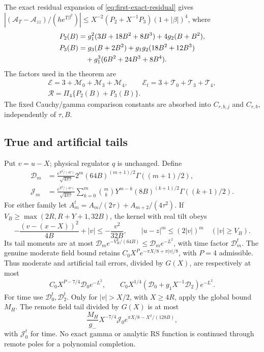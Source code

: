 \documentclass[11pt]{article}
\numberwithin{equation}{section}
\begin{document}
The exact residual expansion of \eqref{eq:first-exact-residual} gives
\(|(\mathcal A_T-\mathcal A_{zz})/(he^{T\beta^2})|
\le X^{-2}(P_2+X^{-1}P_3)(1+|\beta|)^4\), where
\begin{align}
 P_2(B)&=g_1^2(3B+18B^2+8B^3)+4g_2(B+B^2),\\
 P_3(B)&=g_3(B+2B^2)+g_1g_2(18B^2+12B^3)\notag\\
       &\hspace{1em}+g_1^3(6B^2+24B^3+8B^4).
 \label{eq:compact-residual-polynomials}
\end{align}
The factors used in the theorem are
\begin{equation}
 \begin{gathered}
 \mathcal E=3+\mathcal M_0+\mathcal M_3+\mathcal M_4,\qquad
 \mathcal E_t=3+\mathcal T_0+\mathcal T_3+\mathcal T_4,\\
 \mathcal R=\Pi_4\{P_2(B)+P_3(B)\}.
 \end{gathered}
 \label{eq:compact-error-factors}
\end{equation}
The fixed Cauchy/gamma comparison constants are absorbed into
\(C_{r,b,j}\) and \(C_{r,b}\), independently of \(\tau,B\).

\subsection{True and artificial tails}
Put \(v=u-X\); physical regulator \(q\) is unchanged.
Define
\begin{align}
 \mathcal D_m&=\frac{e^{Y^2/(4\tau)}}{\sqrt{4\pi\tau}}
       2^m(64B)^{(m+1)/2}\Gamma((m+1)/2),\\
 \mathcal J_m&=\frac{e^{Y^2/(4\tau)}}{\sqrt{4\pi\tau}}
 \sum_{k=0}^m\binom mk Y^{m-k}(8B)^{(k+1)/2}\Gamma((k+1)/2).
 \label{eq:compact-tail-factors}
\end{align}
For either family let \(A_m^t=A_m/(2\tau)+A_{m+2}/(4\tau^2)\).
If \(V_B\ge\max(2R,R+Y+1,32B)\), the kernel with real tilt obeys
\[
 -\frac{(v-(x-X))^2}{4B}+|v|\le-\frac{v^2}{32B},\qquad
 |u-z|^m\le(2|v|)^m\quad(|v|\ge V_B).
\]
Its tail moments are at most
\(\mathcal D_m e^{-V_B^2/(64B)}\le\mathcal D_m e^{-L^2}\),
with time factor \(\mathcal D_m^t\).
The genuine moderate field bound retains
\(C_0X^Pe^{-\pi X/8+\pi|v|/8}\), with \(P=4\) admissible.
Thus moderate and artificial tail errors, divided by \(G(X)\), are
respectively at most
\begin{gather}
 C_0X^{P-7/4}\mathcal D_0e^{-L^2},\qquad
 C_0X^{1/4}(\mathcal D_0+g_1X^{-1}\mathcal D_2)e^{-L^2}.
 \label{eq:compact-near-tails}
\end{gather}
For time use \(\mathcal D_0^t,\mathcal D_2^t\).
Only for \(|v|>X/2\), with \(X\ge4R\), apply the global bound
\(M_H\). The remote field tail divided by \(G(X)\) is at most
\begin{equation}
 \frac{M_H}{g_-}X^{-7/4}\mathcal J_0
                  e^{\pi X/8-X^2/(128B)},
 \label{eq:compact-remote-tail}
\end{equation}
with \(\mathcal J_0^t\) for time. No exact gamma or analytic RS
function is continued through remote poles for a polynomial completion.
\end{document}
